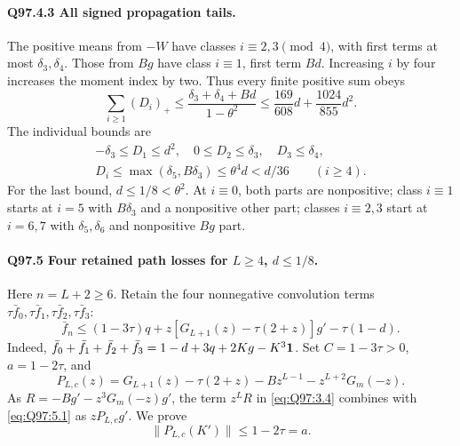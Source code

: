 \paragraph{Q97.4.3 All signed propagation tails.}
The positive means from \(-W\) have classes \(i\equiv2,\allowbreak 3\pmod4\),
with first terms at most \(\delta_3,\allowbreak \delta_4\). Those from \(Bg\)
have class \(i\equiv1\), first term \(Bd\). Increasing \(i\) by four
increases the moment index by two. Thus every finite positive sum obeys
\begin{equation}\tag{Q97.4.6}\label{eq:Q97:4.6}
\sum_{i\ge1}(D_i)_+\le\frac{\delta_3+\delta_4+Bd}{1-\theta^2}
\le\frac{169}{608}d+\frac{1024}{855}d^2.
\end{equation}
The individual bounds are
\begin{equation}\tag{Q97.4.7}\label{eq:Q97:4.7}
\begin{gathered}
-\delta_3\le D_1\le d^2,\quad0\le D_2\le\delta_3,\quad D_3\le\delta_4,\\
D_i\le\max(\delta_5,B\delta_3)\le\theta^4d<d/36\qquad(i\ge4).
\end{gathered}
\end{equation}
For the last bound, \(d\le\allowbreak 1/8<\allowbreak \theta^2\).
At \(i\equiv0\), both parts are nonpositive; class \(i\equiv1\)
starts at \(i=\allowbreak 5\) with \(B\delta_3\) and a nonpositive other part;
classes \(i\equiv2,\allowbreak 3\) start at \(i=\allowbreak 6,\allowbreak 7\) with
\(\delta_5,\allowbreak \delta_6\) and nonpositive \(Bg\) part.

\paragraph{Q97.5 Four retained path losses for \(L\ge\allowbreak 4\), \(d\le\allowbreak 1/8\).}
Here \(n=\allowbreak L+2\ge\allowbreak 6\). Retain the four nonnegative convolution terms
\(\tau\bar f_0,\allowbreak \tau\bar f_1,\allowbreak \tau\bar f_2,\allowbreak \tau\bar f_3\):
\begin{equation}\tag{Q97.5.1}\label{eq:Q97:5.1}
\bar f_n\le(1-3\tau)q
+z[G_{L+1}(z)-\tau(2+z)]g'-\tau(1-d).
\end{equation}
Indeed, \(\bar f_0+\bar f_1+\bar f_2+\bar f_3
=1-d+3q+2Kg-K^3\mathbf1\).
Set \(C=\allowbreak 1-3\tau>\allowbreak 0\), \(a=\allowbreak 1-2\tau\), and
\begin{equation}\tag{Q97.5.2}\label{eq:Q97:5.2}
P_{L,c}(z)=G_{L+1}(z)-\tau(2+z)-Bz^{L-1}-z^{L+2}G_m(-z).
\end{equation}
As \(R=\allowbreak -Bg'-z^3G_m(-z)g'\), the term \(z^LR\) in
\eqref{eq:Q97:3.4} combines with \eqref{eq:Q97:5.1} as
\(zP_{L,\allowbreak c}g'\). We prove
\begin{equation}\tag{Q97.5.3}\label{eq:Q97:5.3}
\boxed{\|P_{L,c}(K')\|\le1-2\tau=a.}
\end{equation}

